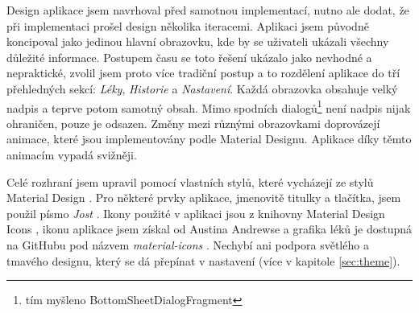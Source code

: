\documentclass[../TakeYourPill.tex]{subfiles}
\begin{document}
Design aplikace jsem navrhoval před samotnou implementací, nutno ale dodat, že při implementaci prošel design několika iteracemi. Aplikaci jsem původně koncipoval jako jedinou hlavní obrazovku, kde by se uživateli ukázali všechny důležité informace. Postupem času se toto řešení ukázalo jako nevhodné a nepraktické, zvolil jsem proto více tradiční postup a to rozdělení aplikace do tří přehledných sekcí: \textit{Léky}, \textit{Historie} a \textit{Nastavení}. Každá obrazovka obsahuje velký nadpis a teprve potom samotný obsah. Mimo spodních dialogů\footnote{tím myšleno BottomSheetDialogFragment} není nadpis nijak ohraničen, pouze je odsazen. Změny mezi různými obrazovkami doprovázejí animace, které jsou implementovány podle Material Designu. Aplikace díky těmto animacím vypadá svižněji.

Celé rozhraní jsem upravil pomocí vlastních stylů, které vycházejí ze stylů Material Design \cite{materialdesign}. Pro některé prvky aplikace, jmenovitě titulky a tlačítka, jsem použil písmo \textit{Jost} \cite{jost}. Ikony použité v aplikaci jsou z knihovny Material Design Icons \cite{icons}, ikonu aplikace jsem získal od Austina Andrewse \cite{pill-icon} a grafika léků je dostupná na GitHubu pod názvem \textit{material-icons} \cite{pills-icons}. Nechybí ani podpora světlého a tmavého designu, který se dá přepínat v nastavení (více v kapitole \ref{sec:theme}).
\end{document}
